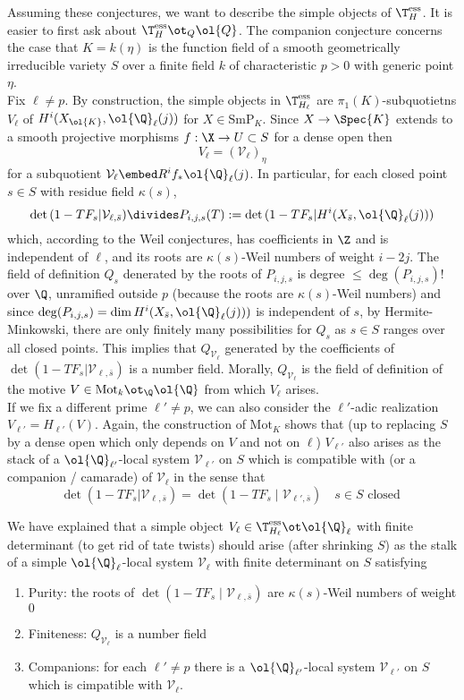 \documentclass{article}
\newcommand{\SmP}{\mathrm{SmP}}
\newcommand{\Mot}{\mathrm{Mot}}
\newcommand{\ess}{\mathrm{ess}}
\newcommand{\Qbar}{\ol{\Q}}
\newcommand{\cV}{\mathcal{V}}
\begin{document}
Assuming these conjectures, we want to describe the simple objects of $\T_H^{\ess}$. It is easier to first ask about $\T_H^{\ess} \ot_Q \ol{Q}$. The companion conjecture concerns the case that $K = k(\eta)$ is the function field of a smooth geometrically irreducible variety $S$ over a finite field $k$ of characteristic $p > 0$ with generic point $\eta$.
\bigskip\\
Fix $\ell \neq p$. By construction, the simple objects in $\T_{H_\ell}^{\ess}$ are $\pi_1(K)$-subquotietns $V_\ell$ of $H^i(X_{\ol{K}}, \Qbar_\ell(j))$ for $X \in \SmP_K$. Since $X \to \Spec{K}$ extends to a smooth projective morphisms $f : \X \to U \subset S$ for a dense open then
\[ V_\ell = (\cV_\ell)_{\eta} \]
for a subquotient $\cV_\ell \embed R^i f_* \Qbar_\ell(j)$. In particular, for each closed point $s \in S$ with residue field $\kappa(s)$, 
\[ \det{(1 - T F_s | \cV_{\ell, \bar{s}})} \divides P_{i,j,s}(T) := \det{(1 - T F_s | H^i(X_{\bar{s}}, \Qbar_\ell(j)))} \]
which, according to the Weil conjectures, has coefficients in $\Z$ and is independent of $\ell$, and its roots are $\kappa(s)$-Weil numbers of weight $i - 2j$. The field of definition $Q_s$ denerated by the roots of $P_{i,j,s}$ is degree $\le \deg(P_{i,j,s})!$ over $\Q$, unramified outside $p$ (because the roots are $\kappa(s)$-Weil numbers) and since $\deg(P_{i,j,s}) = \dim H^i(X_{\bar{s}}, \Qbar_\ell(j)))$ is independent of $s$, by Hermite-Minkowski, there are only finitely many possibilities for $Q_s$ as $s \in S$ ranges over all closed points. This implies that $Q_{\cV_\ell}$ generated by the coefficients of $\det{(1 - T F_s | \cV_{\ell, \bar{s}})}$ is a number field. Morally, $Q_{\cV_\ell}$ is the field of definition of the motive $V \in \Mot_k \ot_{\Q} \ol{\Q}$ from which $V_\ell$ arises. 
\bigskip\\
If we fix a different prime $\ell' \neq p$, we can also consider the $\ell'$-adic realization $V_{\ell'} = H_{\ell'}(V)$. Again, the construction of $\Mot_K$ shows that (up to replacing $S$ by a dense open which only depends on $V$ and not on $\ell$) $V_{\ell'}$ also arises as the stack of a $\Qbar_{\ell'}$-local system $\cV_{\ell'}$ on $S$ which is compatible with (or a companion / camarade) of $\cV_\ell$ in the sense that
\[ \det{(1 - T F_s | \cV_{\ell, \bar{s}})} = \det{(1 - T F_s \mid \cV_{\ell', \bar{s}})} \quad s \in S \text{ closed } \]

We have explained that a simple object $V_\ell \in \T_{H_{\ell}}^{\ess} \ot \Qbar_\ell$ with finite determinant (to get rid of tate twists) should arise (after shrinking $S$) as the stalk of a simple $\Qbar_\ell$-local system $\cV_\ell$ with finite determinant on $S$ satisfying
\begin{enumerate}
\item Purity: the roots of $\det{(1 - T F_s \mid \cV_{\ell, \bar{s}})}$ are $\kappa(s)$-Weil numbers of weight $0$
\item Finiteness: $Q_{\cV_{\ell}}$ is a number field
\item Companions: for each $\ell' \neq p$ there is a $\Qbar_{\ell'}$-local system $\cV_{\ell'}$ on $S$ which is cimpatible with $\cV_\ell$. 
\end{enumerate}
\end{document}
